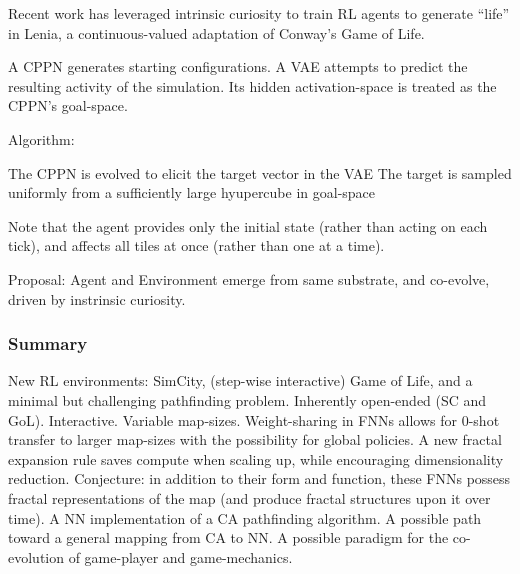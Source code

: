 \documentclass[xcolor=dvipsnames]{beamer}
\begin{document}
\begin{frame}
	Recent work has leveraged intrinsic curiosity to train RL agents to generate ``life'' in Lenia, a continuous-valued adaptation of Conway's Game of Life.
\begin{outline}
	\1 A CPPN generates starting configurations.
	\1 A VAE attempts to predict the resulting activity of the simulation.
		\2 Its hidden activation-space is treated as the CPPN's goal-space.
\end{outline}
	Algorithm:
\begin{outline}
    \1 The CPPN is evolved to elicit the target vector in the VAE 
    \1 The target is sampled uniformly from a sufficiently large hyupercube in goal-space
\end{outline}
    Note that the agent provides only the initial state (rather than acting on each tick), and affects all tiles at once (rather than one at a time).
\end{frame}
\begin{frame}
	Proposal: Agent and Environment emerge from same substrate, and co-evolve, driven by instrinsic curiosity.
\end{frame}

\begin{frame}
    \frametitle{Summary}
    \begin{outline}
        \1 New RL environments: SimCity, (step-wise interactive) Game of Life, and a minimal but challenging pathfinding problem.
            \2 Inherently open-ended (SC and GoL). Interactive.
            \2 Variable map-sizes.
        \1 Weight-sharing in FNNs allows for 0-shot transfer to larger map-sizes with the possibility for global policies.
        \1 A new fractal expansion rule saves compute when scaling up, while encouraging dimensionality reduction.
            \2 Conjecture: in addition to their form and function, these FNNs possess fractal representations of the map (and produce fractal structures upon it over time).
        \1 A NN implementation of a CA pathfinding algorithm.
            \2 A possible path toward a general mapping from CA to NN.
            \2 A possible paradigm for the co-evolution of game-player and game-mechanics.
    \end{outline}
\end{frame}
\end{document}
